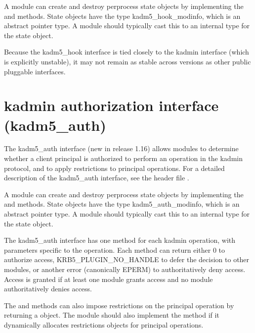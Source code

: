 \documentclass[letterpaper,10pt,english]{sphinxmanual}
\begin{document}
\sphinxAtStartPar
A module can create and destroy per\sphinxhyphen{}process state objects by
implementing the  and  methods.  State objects have
the type kadm5\_hook\_modinfo, which is an abstract pointer type.  A
module should typically cast this to an internal type for the state
object.

\sphinxAtStartPar
Because the kadm5\_hook interface is tied closely to the kadmin
interface (which is explicitly unstable), it may not remain as stable
across versions as other public pluggable interfaces.


\section{kadmin authorization interface (kadm5\_auth)}
\label{\detokenize{plugindev/kadm5_auth:kadmin-authorization-interface-kadm5-auth}}\label{\detokenize{plugindev/kadm5_auth:kadm5-auth-plugin}}\label{\detokenize{plugindev/kadm5_auth::doc}}
\sphinxAtStartPar
The kadm5\_auth interface (new in release 1.16) allows modules to
determine whether a client principal is authorized to perform an
operation in the kadmin protocol, and to apply restrictions to
principal operations.  For a detailed description of the kadm5\_auth
interface, see the header file .

\sphinxAtStartPar
A module can create and destroy per\sphinxhyphen{}process state objects by
implementing the  and  methods.  State objects have
the type kadm5\_auth\_modinfo, which is an abstract pointer type.  A
module should typically cast this to an internal type for the state
object.

\sphinxAtStartPar
The kadm5\_auth interface has one method for each kadmin operation,
with parameters specific to the operation.  Each method can return
either 0 to authorize access, KRB5\_PLUGIN\_NO\_HANDLE to defer the
decision to other modules, or another error (canonically EPERM) to
authoritatively deny access.  Access is granted if at least one module
grants access and no module authoritatively denies access.

\sphinxAtStartPar
The  and  methods can also impose restrictions
on the principal operation by returning a  object.  The module should also implement
the  method if it dynamically allocates
restrictions objects for principal operations.
\end{document}
